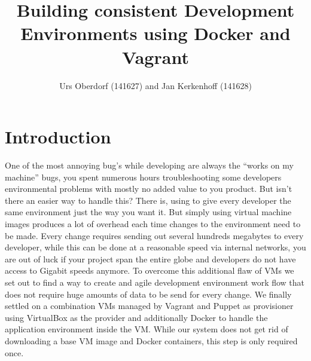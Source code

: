

\title{Building consistent Development Environments using Docker and Vagrant }
\author{Urs Oberdorf (141627) and Jan Kerkenhoff (141628)}



\maketitle


\thispagestyle{empty}

\clearpage
{}
\setcounter{page}{1}
\tableofcontents

\clearpage
{}

\section{Introduction}

One of the most annoying bug’s while developing are always the “works on my machine” bugs, you spent numerous hours troubleshooting some developers environmental problems with mostly no added value to you product. But isn’t there an easier way to handle this? There is, using to give every developer the same environment just the way you want it. But simply using virtual machine images produces a lot of overhead each time changes to the environment need to be made. Every change requires sending out several hundreds megabytes to every developer, while this can be done at a reasonable speed via internal networks, you are out of luck if your project span the entire globe and developers do not have access to Gigabit speeds anymore. To overcome this additional flaw of \glspl{VM} we set out to find a way to create and agile development environment work flow that does not require huge amounts of data to be send for every change.
We finally settled on a combination \glspl{VM} managed by Vagrant and Puppet as \gls{provisioner} using VirtualBox as the \gls{provider} and additionally Docker to handle the application environment inside the \gls{VM}. While our system does not get rid of downloading a base \gls{VM} image and Docker containers, this step is only required once.


